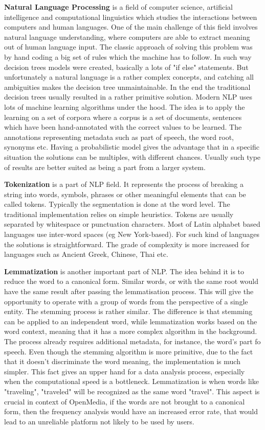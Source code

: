 \textbf{Natural Language Processing} is a field of computer science, artificial intelligence and computational linguistics which studies the interactions between computers and human languages. One of the main challenge of this field involves natural language understanding, where computers are able to extract meaning out of human language input. The classic approach of solving this problem was by hand coding a big set of rules which the machine has to follow. In such way decision trees models were created, basically a lots of "if else" statements. But unfortunately a natural language is a rather complex concepts, and catching all ambiguities makes the decision tree unmaintainable. In the end the traditional decision trees usually resulted in a rather primitive solution. Modern NLP uses lots of machine learning algorithms under the hood. The idea is to apply the learning on a set of corpora where a corpus is a set of documents, sentences which have been hand-annotated with the correct values to be learned. The annotations representing metadata such as part of speech, the word root, synonyms etc. Having a probabilistic model gives the advantage that in a specific situation the solutions can be multiples, with different chances. Usually such type of results are better suited as being a part from a larger system.

\textbf{Tokenization} is a part of NLP field. It represents the process of breaking a string into words, symbols, phrases or other meaningful elements that can be called tokens. Typically the segmentation is done at the word level. The traditional implementation relies on simple heuristics. Tokens are usually separated by whitespace or punctuation characters. Most of Latin alphabet based languages use inter-word spaces (eg New York-based). For such kind of languages the solutions is straightforward. The grade of complexity is more increased for languages such as Ancient Greek, Chinese, Thai etc.

\textbf{Lemmatization} is another important part of NLP. The idea behind it is to reduce the word to a canonical form. Similar words, or with the same root would have the same result after passing the lemmatisation process. This will give the opportunity to operate with a group of words from the perspective of a single entity. The stemming process is rather similar. The difference is that stemming can be applied to an independent word, while lemmatization works based on the word context, meaning that it has a more complex algorithm in the background. The process already requires additional metadata, for instance, the word's part fo speech. Even though the stemming algorithm is more primitive, due to the fact that it doesn't discriminate the word meaning, the implementation is much simpler. This fact gives an upper hand for a data analysis process, especially when the computational speed is a bottleneck. Lemmatization is when words like "traveling", "traveled" will be recognized as the same word "travel". This aspect is crucial in context of OpenMedia, if the words are not brought to a canonical form, then the frequency analysis would have an increased error rate, that would lead to an unreliable platform not likely to be used by users.

